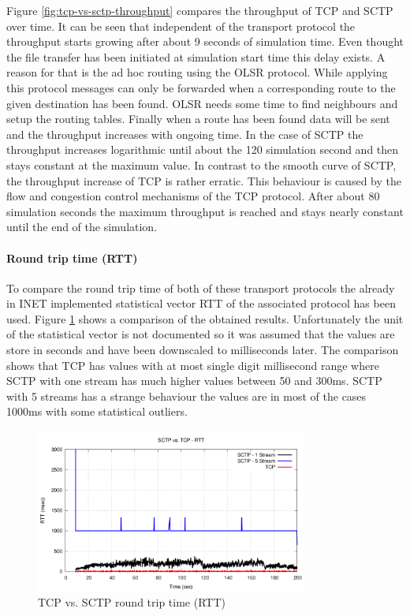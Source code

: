 \documentclass[a4paper]{article}
\begin{document}
Figure \ref{fig:tcp-vs-sctp-throughput} compares the throughput of TCP and SCTP over time. It can be seen that independent of the transport protocol the throughput starts growing after about 9 seconds of simulation time. Even thought the file transfer has been initiated at simulation start time this delay exists. A reason for that is the ad hoc routing using the OLSR protocol. While applying this protocol messages can only be forwarded when a corresponding route to the given destination has been found. OLSR needs some time to find neighbours and setup the routing tables. 
Finally when a route has been found data will be sent and the throughput increases with ongoing time. In the case of SCTP the throughput increases logarithmic until about the 120 simulation second and then stays constant at the maximum value. In contrast to the smooth curve of SCTP, the throughput increase of TCP is rather erratic. This behaviour is caused by the flow and congestion control mechanisms of the TCP protocol. After about 80 simulation seconds the maximum throughput is reached and stays nearly constant until the end of the simulation.

\paragraph{Round trip time (RTT)}

To compare the round trip time of both of these transport protocols the already in INET implemented statistical vector RTT of the associated protocol has been used.
Figure \ref{fig:tcp-vs-sctp-rtt} shows a comparison of the obtained results. Unfortunately the unit of the statistical vector is not documented so it was assumed that the values are store in seconds and have been downscaled to milliseconds later.
The comparison shows that TCP has values with at most single digit millisecond range where SCTP with one stream has much higher values between 50 and 300ms. SCTP with 5 streams has a strange behaviour the values are in most of the cases 1000ms with some statistical outliers. 

\begin{figure}[H]
	\centering
	\includegraphics[width=0.8\textwidth]{imgs/sctp-vs-tcp-rtt.png}
	\caption{TCP vs. SCTP round trip time (RTT)}
	\label{fig:tcp-vs-sctp-rtt}
\end{figure}
\end{document}
